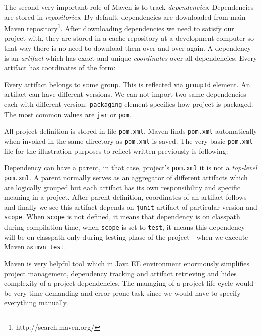 \documentclass[12pt,final,oneside]{fithesis}
\begin{document}
The second very important role of Maven is to track \textit{dependencies}. Dependencies are stored in \textit{repositories}. By default, dependencies are downloaded from main Maven repository\footnote{http://search.maven.org/}. After downloading dependencies we need to satisfy our project with, they are stored in a cache repository at a development computer so that way there is no need to download them over and over again. A dependency is an \textit{artifact} which has exact and unique \textit{coordinates} over all dependencies. Every artifact has coordinates of the form:
\begin{center}
	\begin{minipage}{.7\textwidth}
		
	\end{minipage}
\end{center}
Every artifact belongs to some group. This is reflected via \texttt{groupId} element. An artifact can have different versions. We can not import two same dependencies each with different version. \texttt{packaging} element specifies how project is packaged. The most common values are \texttt{jar} or \texttt{pom}.

All project definition is stored in file \texttt{pom.xml}. Maven finds \texttt{pom.xml} automatically when invoked in the same directory as \texttt{pom.xml} is saved. The very basic \texttt{pom.xml} file for the illustration purposes to reflect written previously is following:



Dependency can have a parent, in that case, project's \texttt{pom.xml} it is not a \textit{top-level} \texttt{pom.xml}. A parent normally serves as an aggregator of different artifacts which are logically grouped but each artifact has its own responsibility and specific meaning in a project. After parent definition, coordinates of an artifact follows and finally we see this artifact depends on \texttt{junit} artifact of particular version and \texttt{scope}. When \texttt{scope} is not defined, it means that dependency is on classpath during compilation time, when \texttt{scope} is set to \texttt{test}, it means this dependency will be on classpath only during testing phase of the project - when we execute Maven as \texttt{mvn test}.

Maven is very helpful tool which in Java EE environment enormously simplifies project management, dependency tracking and artifact retrieving and hides complexity of a project dependencies. The managing of a project life cycle would be very time demanding and error prone task since we would have to specify everything manually. 
\end{document}
